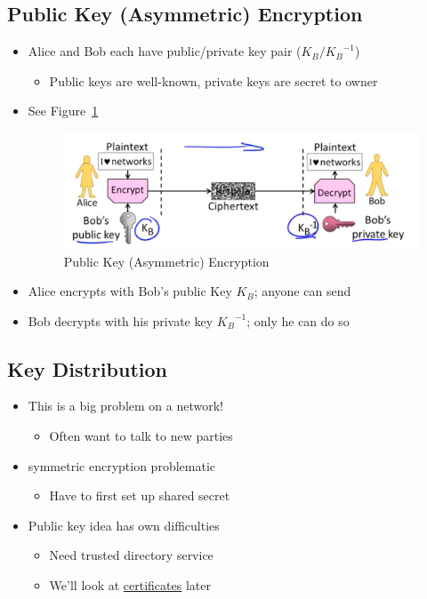 \documentclass[12pt]{ctexart}   %
\begin{document}
	\subsection{Public Key (Asymmetric) Encryption}
	\begin{itemize}
		\item Alice and Bob each have public/private key pair ($K_
		{B} / {K_{B}}^{-1}$)
		\begin{itemize}
			\item Public keys are well-known, private keys are secret to owner
		\end{itemize}
		\item See Figure~\ref{fig:10-2-5}
		  
		\begin{figure}[h!] %
		\centering
		\includegraphics[scale=0.7]{images/10-2-5}
		\caption{Public Key (Asymmetric) Encryption}
		\label{fig:10-2-5}
		\end{figure}

		\item Alice encrypts with Bob's public Key $K_{B}$; anyone can send
		\item Bob decrypts with his private key ${K_{B}}^{-1}$; only he can do so
	\end{itemize}

	\subsection{Key Distribution}
	\begin{itemize}
		\item This is a big problem on a network!
		\begin{itemize}
			\item Often want to talk to new parties
		\end{itemize}

		\item symmetric encryption problematic
		\begin{itemize}
			\item Have to first set up shared secret
		\end{itemize}

		\item  Public key idea has own difficulties
		\begin{itemize}
			\item Need trusted directory service
			\item We'll look at \underline{certificates} later
		\end{itemize}
	\end{itemize}
\end{document}
